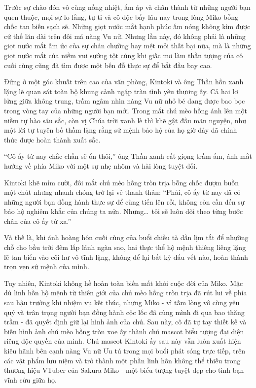 \documentclass[../main.tex]{subfiles}
\begin{document}
Trước sự chào đón vô cùng nồng nhiệt, ấm áp và chân thành từ những người bạn quen thuộc, mọi sự lo lắng, tự ti và cô độc bấy lâu nay trong lòng Miko bỗng chốc tan biến sạch sẽ. Những giọt nước mắt hạnh phúc ấm nóng không kìm được cứ thế lăn dài trên đôi má nàng Vu nữ. Nhưng lần này, đó không phải là những giọt nước mắt ấm ức của sự chán chường hay mệt mỏi thất bại nữa, mà là những giọt nước mắt của niềm vui sướng tột cùng khi giấc mơ làm thần tượng của cô cuối cùng cũng đã tìm được một bến đỗ thực sự để bắt đầu bay cao.

Đứng ở một góc khuất trên cao của văn phòng, Kintoki và ông Thần hồn xanh lặng lẽ quan sát toàn bộ khung cảnh ngập tràn tình yêu thương ấy. Cả hai lơ lửng giữa không trung, trầm ngâm nhìn nàng Vu nữ nhỏ bé đang được bao bọc trong vòng tay của những người bạn mới. Trong mắt chú mèo hồng ánh lên một niềm tự hào sâu sắc, còn vị Chúa trời xanh lè thì khẽ gật đầu mãn nguyện, như một lời tự tuyên bố thầm lặng rằng sứ mệnh bảo hộ của họ giờ đây đã chính thức được hoàn thành xuất sắc.

``Cô ấy từ nay chắc chắn sẽ ổn thôi,'' ông Thần xanh cất giọng trầm ấm, ánh mắt hướng về phía Miko với một sự nhẹ nhõm và hài lòng tuyệt đối.

Kintoki khẽ mỉm cười, đôi mắt chú mèo hồng tròn trịa bỗng chốc đượm buồn một chút nhưng nhanh chóng trở lại vẻ thanh thản: ``Phải, cô ấy từ nay đã có những người bạn đồng hành thực sự để cùng tiến lên rồi, không còn cần đến sự bảo hộ nghiêm khắc của chúng ta nữa. Nhưng\dots\ tôi sẽ luôn dõi theo từng bước chân của cô ấy từ xa.''

Và thế là, khi ánh hoàng hôn cuối cùng của buổi chiều tà dần lịm tắt để nhường chỗ cho bầu trời đêm lấp lánh ngàn sao, hai thực thể hộ mệnh thiêng liêng lặng lẽ tan biến vào cõi hư vô tĩnh lặng, không để lại bất kỳ dấu vết nào, hoàn thành trọn vẹn sứ mệnh của mình.

Tuy nhiên, Kintoki không hề hoàn toàn biến mất khỏi cuộc đời của Miko. Mặc dù linh hồn hộ mệnh từ thiên giới của chú mèo hồng tròn trịa đã rút lui về phía sau hậu trường khi nhiệm vụ kết thúc, nhưng Miko - vì tấm lòng vô cùng yêu quý và trân trọng người bạn đồng hành cộc lốc đã cùng mình đi qua bao thăng trầm - đã quyết định giữ lại hình ảnh của chú. Sau này, cô đã tự tay thiết kế và biến hình ảnh chú mèo hồng tròn xoe ấy thành chú mascot biểu tượng đại diện riêng độc quyền của mình. Chú mascot Kintoki ấy sau này vẫn luôn xuất hiện kiêu hãnh bên cạnh nàng Vu nữ Ưu tú trong mọi buổi phát sóng trực tiếp, trên các vật phẩm lưu niệm và trở thành một phần linh hồn không thể thiếu trong thương hiệu VTuber của Sakura Miko - một biểu tượng tuyệt đẹp cho tình bạn vĩnh cửu giữa họ.
\end{document}

